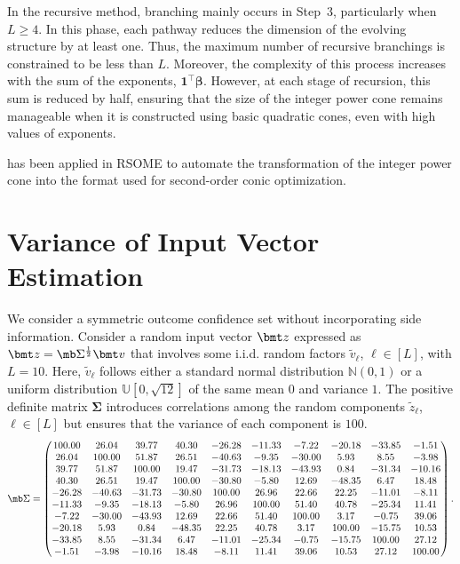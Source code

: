 \documentclass[mnsc, nonblindrev]{informswp}
\newcommand{\1}[1]{\mathds{1}{\left(#1\right)}}
\begin{document}
\begin{appendices}
In the recursive method, branching mainly occurs in Step~$3$, particularly when $L \geq 4$. In this phase, each pathway reduces the dimension of the evolving structure by at least one. Thus, the maximum number of recursive branchings is constrained to be less than \(L\). Moreover, the complexity of this process increases with the sum of the exponents, \(\bm{1}^\top \bm{\beta}\). However, at each stage of recursion, this sum is reduced by half, ensuring that the size of the integer power cone remains manageable when it is constructed using basic quadratic cones, even with high values of exponents.

 has been applied in RSOME to automate the transformation of the integer power cone into the format used for second-order conic optimization.

\section{Variance of Input Vector Estimation}
\label{sec:sensitive_input}
We consider a symmetric outcome confidence set without incorporating side information. Consider a random input vector $\bmt z$ expressed as $\bmt z = \mb \Sigma^{\frac{1}{2}} \bmt v$ that involves some i.i.d. random factors $\tilde v_\ell$, $\ell \in [L]$, with $L = 10$. Here, $\tilde v_\ell$ follows either a standard normal distribution $\mathbb{N}(0,1)$ or a uniform distribution $\mathbb{U}[0,\sqrt{12}]$ of the same mean $0$ and variance $1$. The positive definite matrix $\bm \Sigma$ introduces correlations among the random components $\tilde z_\ell$, $\ell \in [L]$ but ensures that the variance of each component is $100$.
$$
\mb \Sigma = 
\begin{pmatrix}
    100.00 & 26.04  & 39.77  & 40.30  & -26.28 & -11.33 & -7.22  & -20.18 & -33.85 & -1.51  \\
26.04  & 100.00 & 51.87  & 26.51  & -40.63 & -9.35  & -30.00 & 5.93   & 8.55   & -3.98  \\
39.77  & 51.87  & 100.00 & 19.47  & -31.73 & -18.13 & -43.93 & 0.84   & -31.34 & -10.16 \\
40.30  & 26.51  & 19.47  & 100.00 & -30.80 & -5.80  & 12.69  & -48.35 & 6.47   & 18.48  \\
-26.28 & -40.63 & -31.73 & -30.80 & 100.00 & 26.96  & 22.66  & 22.25  & -11.01 & -8.11  \\
-11.33 & -9.35  & -18.13 & -5.80  & 26.96  & 100.00 & 51.40  & 40.78  & -25.34 & 11.41  \\
-7.22  & -30.00 & -43.93 & 12.69  & 22.66  & 51.40  & 100.00 & 3.17   & -0.75  & 39.06  \\
-20.18 & 5.93   & 0.84   & -48.35 & 22.25  & 40.78  & 3.17   & 100.00 & -15.75 & 10.53  \\
-33.85 & 8.55   & -31.34 & 6.47   & -11.01 & -25.34 & -0.75  & -15.75 & 100.00 & 27.12  \\
-1.51  & -3.98  & -10.16 & 18.48  & -8.11  & 11.41  & 39.06  & 10.53  & 27.12  & 100.00 
\end{pmatrix}.
$$


\end{appendices}
\end{document}
